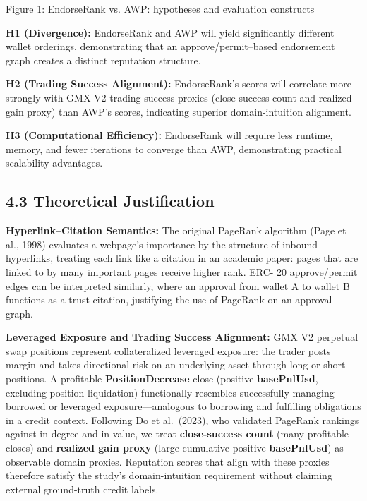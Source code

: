 \begin{center}

\end{center}


\begin{center}Figure 1: EndorseRank vs. AWP: hypotheses and evaluation constructs\end{center}

\textbf{H1 (Divergence): }EndorseRank and AWP will yield significantly different wallet orderings, demonstrating that an approve/permit--based endorsement graph creates a distinct reputation structure.


\textbf{H2 (Trading Success Alignment): }EndorseRank's scores will correlate more strongly with GMX V2 trading-success proxies (close-success count and realized gain proxy) than AWP's scores, indicating superior domain-intuition alignment.


\textbf{H3 (Computational Efficiency): }EndorseRank will require less runtime, memory, and fewer iterations to converge than AWP, demonstrating practical scalability advantages.


\subsection*{4.3 Theoretical Justification}
\label{sec:theoretical-justification}

\textbf{Hyperlink--Citation Semantics: }The original PageRank algorithm (Page et al., 1998) evaluates a webpage's importance by the structure of inbound hyperlinks, treating each link like a citation in an academic paper: pages that are linked to by many important pages receive higher rank. ERC- 20 approve/permit edges can be interpreted similarly, where an approval from wallet A to wallet B functions as a trust citation, justifying the use of PageRank on an approval graph.


\textbf{Leveraged Exposure and Trading Success Alignment: }GMX V2 perpetual swap positions represent collateralized leveraged exposure: the trader posts margin and takes directional risk on an underlying asset through long or short positions. A profitable \textbf{PositionDecrease} close (positive \textbf{basePnlUsd}, excluding position liquidation) functionally resembles successfully managing borrowed or leveraged exposure---analogous to borrowing and fulfilling obligations in a credit context. Following Do et al.\ (2023), who validated PageRank rankings against in-degree and in-value, we treat \textbf{close-success count} (many profitable closes) and \textbf{realized gain proxy} (large cumulative positive \textbf{basePnlUsd}) as observable domain proxies. Reputation scores that align with these proxies therefore satisfy the study's domain-intuition requirement without claiming external ground-truth credit labels.



